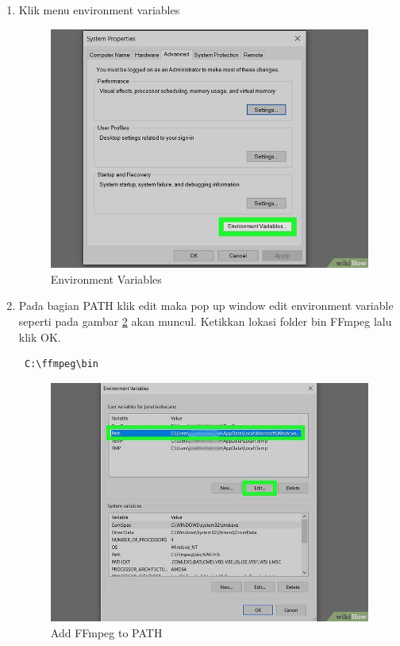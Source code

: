 \begin{enumerate}
\item Klik menu environment variables
\begin{figure}[H]
\centering
\includegraphics[scale=1.5]{figures/python11}
\caption{Environment Variables}
\label{python11}
\end{figure}

\item Pada bagian PATH klik edit maka pop up window edit environment variable seperti pada gambar \ref{python12} akan muncul. Ketikkan lokasi folder bin FFmpeg lalu klik OK.
\begin{verbatim}
 C:\ffmpeg\bin
\end{verbatim}

\begin{figure}[H]
\centering
\includegraphics[scale=1.1]{figures/python12}
\caption{Add FFmpeg to PATH}
\label{python12}
\end{figure}


\end{enumerate}
